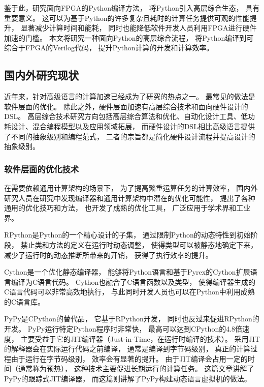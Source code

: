 鉴于此，研究面向FPGA的Python编译方法，
将Python引入高层综合生态，
具有重要意义。
这可以为基于Python的许多复杂且耗时的计算任务提供可观的性能提升，
显著减少计算时间和能耗，
同时也能降低软件开发人员利用FPGA进行硬件加速的门槛。
本文将研究一种面向Python的高层综合流程，
将Python编译到可综合于FPGA的Verilog代码，
提升Python计算的开发和计算效率。

\subsection{国内外研究现状}

近年来，针对高级语言的计算加速已经成为了研究的热点之一。
最常见的做法是软件层面的优化。
除此之外，硬件层面加速有高层综合技术和面向硬件设计的DSL。
高层综合技术研究方向包括高层综合算法和优化、自动化设计工具、低功耗设计、混合编程模型以及应用领域拓展，
而硬件设计的DSL相比高级语言提供了不同的抽象级别和编程范式，
二者的宗旨都是简化硬件设计流程并提高设计的抽象级别。

\subsubsection{软件层面的优化技术}

在需要依赖通用计算架构的场景下，
为了提高繁重运算任务的计算效率，
国内外研究人员在研究中发现编译器和通用计算架构中潜在的优化可能性，
提出了各种通用的优化技巧和方法，
也开发了成熟的优化工具，
广泛应用于学术界和工业界。

RPython\cite{rpython}是Python的一个精心设计的子集，
通过限制Python的动态特性到初始阶段，
禁止类和方法的定义在运行时动态调整，
使得类型可以被静态地确定下来，
减少了运行时的动态推断所带来的开销，
获得了执行效率的提升。

Cython\cite{cython}是一个优化静态编译器，
能够将Python语言和基于Pyrex的Cython扩展语言编译为C语言代码。
Cython也融合了C语言函数以及类型，
使得编译器生成的C语言代码可以非常高效地执行，
与此同时开发人员也可以在Python中利用成熟的C语言库。

PyPy\cite{pypy3}是CPython的替代品，
它基于RPython\cite{rpython}开发，
同时也反过来促进RPython的开发。
PyPy运行特定Python程序时非常快，
最高可以达到CPython的4.8倍速度，
主要受益于它的JIT编译器（Just-in-Time，在运行时编译的技术）\cite{jit}。
采用JIT的解释器会在实际运行代码之前编译，
通常是编译到字节码\cite{bytecode}级别，
真正的计算过程由于运行在字节码级别，
效率会有显著的提升。
由于JIT编译会占用一定的时间（通常称为预热），
这种技术主要促进长期运行的计算任务。
这篇文章\cite{pypy1}讲解了PyPy的跟踪式JIT编译器，
而这篇\cite{pypy2}则讲解了PyPy构建动态语言虚拟机的做法。


